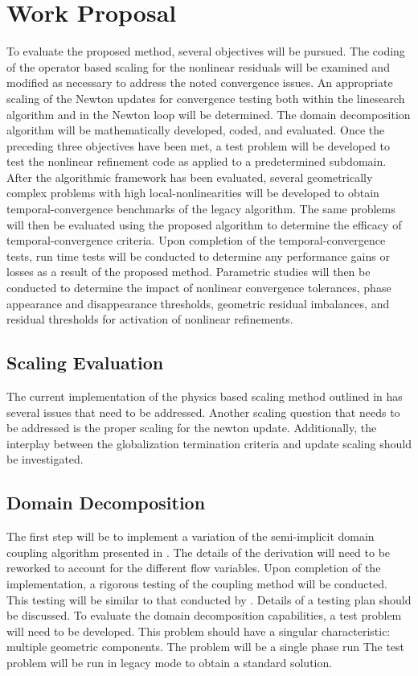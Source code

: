 \chapter{Work Proposal}
\label{chap:proposal}
To evaluate the proposed method, several objectives will be pursued.
The coding of the operator based scaling for the nonlinear residuals will be examined and modified as necessary to address the noted convergence issues.
An appropriate scaling of the Newton updates for convergence testing both within the linesearch algorithm and in the Newton loop will be determined.
The domain decomposition algorithm will be mathematically developed, coded, and evaluated.
Once the preceding three objectives have been met, a test problem will be developed to test the nonlinear refinement code as applied to a predetermined subdomain.
After the algorithmic framework has been evaluated, several geometrically complex problems with high local-nonlinearities will be developed to obtain temporal-convergence benchmarks of the legacy algorithm.
The same problems will then be evaluated using the proposed algorithm to determine the efficacy of temporal-convergence criteria.
Upon completion of the temporal-convergence tests, run time tests will be conducted to determine any performance gains or losses as a result of the proposed method.
Parametric studies will then be conducted to determine the impact of nonlinear convergence tolerances, phase appearance and disappearance thresholds, geometric residual imbalances, and residual thresholds for activation of nonlinear refinements.

\section{Scaling Evaluation}
\label{sect:proposal_scaling}
The current implementation of the physics based scaling method outlined in  has several issues that need to be addressed.
Another scaling question that needs to be addressed is the proper scaling for the newton update.
Additionally, the interplay between the globalization termination criteria and update scaling should be investigated. 

\section{Domain Decomposition}
\label{sect:domain_coupling}
The first step will be to implement a variation of the semi-implicit domain coupling algorithm presented in .
The details of the derivation will need to be reworked to account for the different flow variables.
Upon completion of the implementation, a rigorous testing of the coupling method will be conducted.
This testing will be similar to that conducted by \citet{Weaver2002}.
Details of a testing plan should be discussed.
To evaluate the domain decomposition capabilities, a test problem will need to be developed.
This problem should have a singular characteristic: multiple geometric components.
The problem will be a single phase run
The test problem will be run in legacy mode to obtain a standard solution.

